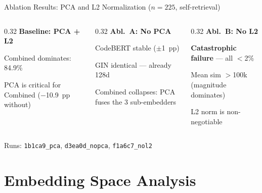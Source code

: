 \documentclass[aspectratio=169,10pt]{beamer}
\begin{document}
\begin{frame}{Ablation Results: PCA and L2 Normalization ($n{=}225$, self-retrieval)}
  \vspace{0.6em}
  \begin{columns}[T]
  \begin{column}{0.32\textwidth}
    {\small\textbf{\textcolor{hit}{Baseline: PCA + L2}}}
    \begin{itemize}\setlength{\itemsep}{2pt}
      {\scriptsize
      \item Combined dominates: 84.9\%
      \item PCA is critical for Combined ($-$10.9~pp without)}
    \end{itemize}
  \end{column}
  \begin{column}{0.32\textwidth}
    {\small\textbf{\textcolor{warn}{Abl.\ A: No PCA}}}
    \begin{itemize}\setlength{\itemsep}{2pt}
      {\scriptsize
      \item CodeBERT stable ($\pm$1~pp)
      \item GIN identical — already 128d
      \item Combined collapses: PCA fuses the 3 sub-embedders}
    \end{itemize}
  \end{column}
  \begin{column}{0.32\textwidth}
    {\small\textbf{\textcolor{miss}{Abl.\ B: No L2}}}
    \begin{itemize}\setlength{\itemsep}{2pt}
      {\scriptsize
      \item \textbf{Catastrophic failure} — all $<$2\%
      \item Mean sim $>$100k (magnitude dominates)
      \item L2 norm is non-negotiable}
    \end{itemize}
  \end{column}
  \end{columns}

  \vspace{0.3em}
  {\scriptsize\color{black!55}
  Runs: \texttt{1b1ca9\_pca}, \texttt{d3ea0d\_nopca}, \texttt{f1a6c7\_nol2}}
\end{frame}

\section{Embedding Space Analysis}
\end{document}
